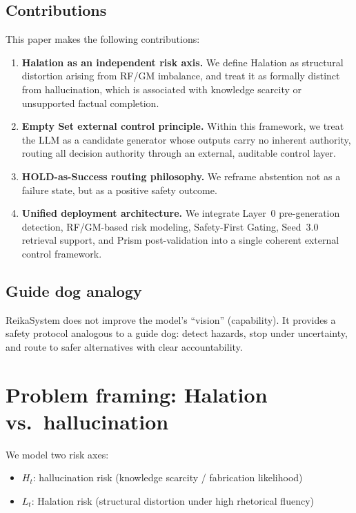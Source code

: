 \documentclass[11pt,a4paper]{article}
\begin{document}
\subsection{Contributions}
This paper makes the following contributions:
\begin{enumerate}
\item \textbf{Halation as an independent risk axis.} We define Halation as structural distortion
arising from RF/GM imbalance, and treat it as formally distinct from hallucination, which
is associated with knowledge scarcity or unsupported factual completion.

\item \textbf{Empty Set external control principle.} Within this framework, we treat the LLM as
a candidate generator whose outputs carry no inherent authority, routing all decision authority
through an external, auditable control layer.

\item \textbf{HOLD-as-Success routing philosophy.} We reframe abstention not as a failure state,
but as a positive safety outcome.

\item \textbf{Unified deployment architecture.} We integrate Layer~0 pre-generation detection,
RF/GM-based risk modeling, Safety-First Gating, Seed~3.0 retrieval support, and Prism
post-validation into a single coherent external control framework.
\end{enumerate}

\subsection{Guide dog analogy}
ReikaSystem does not improve the model's ``vision'' (capability). It provides a safety protocol
analogous to a guide dog: detect hazards, stop under uncertainty, and route to safer alternatives
with clear accountability.

\section{Problem framing: Halation vs.\ hallucination}

We model two risk axes:
\begin{itemize}
\item $H_t$: hallucination risk (knowledge scarcity / fabrication likelihood)
\item $L_t$: Halation risk (structural distortion under high rhetorical fluency)
\end{itemize}
\end{document}
